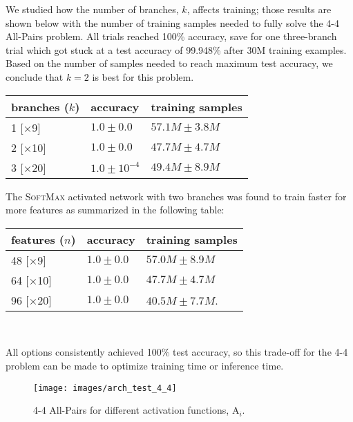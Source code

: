 We studied how the number of branches, $k$, affects training; those
results are shown below with the number of training samples needed to
fully solve the 4-4 All-Pairs problem.  All trials reached 100\% accuracy,
save for one three-branch trial which got stuck at a test accuracy of
99.948\% after 30M training examples.  Based on the number of samples
needed to reach maximum test accuracy, we conclude that $k=2$ is best
for this problem.
\begin{center}
\begin{tabular}{ l l l }
branches ($k$) & accuracy  & training samples \\
\hline
 1 [$\times$9] & $1.0 \pm 0.0$                     & $57.1M \pm 3.8M$ \\
 2 [$\times$10] & $1.0 \pm 0.0$                   & $47.7M \pm 4.7M$    \\
 3 [$\times$20] & $1.0 \pm 10^{-4}$     & $49.4M \pm 8.9M$   \\
\end{tabular}\label{branches}
\end{center}
The \textsc{SoftMax} activated network with two branches was found to train
faster for more features as summarized in the following table:  \\
\begin{center}
\begin{tabular}{ l l l }
features ($n$) & accuracy  & training samples \\
\hline
 48 [$\times$9] & $1.0 \pm 0.0$       & $57.0M \pm 8.9M$ \\
 64 [$\times$10] & $1.0 \pm 0.0$     & $47.7M \pm 4.7M$    \\
 96 [$\times$20] & $1.0 \pm 0.0$     & $40.5M \pm 7.7M$.   \\
\end{tabular} \\
\end{center}
All options consistently achieved 100\% test accuracy, so this trade-off
for the 4-4 problem can be made to optimize training time or inference
time.

\begin{figure*}[!htb]
\centering
{}
  \texttt{[image: images/arch\_test\_4\_4]}
\endminipage\hfill
\caption{4-4 All-Pairs for different activation functions, \textsc{A}$_i$.}
\label{arch_search_fig}
\end{figure*}

